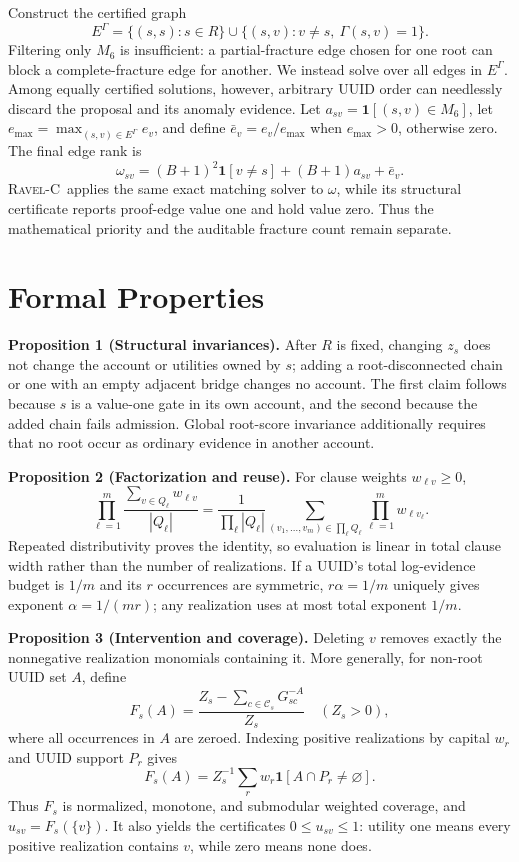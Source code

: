 \documentclass[runningheads]{llncs}
\newcommand{\ravelc}{\textsc{Ravel-C}}
\begin{document}
Construct the certified graph
\[
E^\Gamma=
\{(s,s):s\in R\}\cup
\{(s,v):v\ne s,\ \Gamma(s,v)=1\}.
\]
Filtering only \(M_6\) is insufficient: a partial-fracture edge chosen for one root can block a complete-fracture edge for another. We instead solve over all edges in \(E^\Gamma\). Among equally certified solutions, however, arbitrary UUID order can needlessly discard the proposal and its anomaly evidence. Let \(a_{sv}=\mathbf 1[(s,v)\in M_6]\), let \(e_{\max}=\max_{(s,v)\in E^\Gamma}e_v\), and define \(\bar e_v=e_v/e_{\max}\) when \(e_{\max}>0\), otherwise zero. The final edge rank is
\[
\omega_{sv}
=(B+1)^2\mathbf 1[v\ne s]
+(B+1)a_{sv}
+\bar e_v.
\]
\ravelc\ applies the same exact matching solver to \(\omega\), while its structural certificate reports proof-edge value one and hold value zero. Thus the mathematical priority and the auditable fracture count remain separate.

\section{Formal Properties}

\textbf{Proposition 1 (Structural invariances).}
After \(R\) is fixed, changing \(z_s\) does not change the account or utilities owned by \(s\); adding a root-disconnected chain or one with an empty adjacent bridge changes no account. The first claim follows because \(s\) is a value-one gate in its own account, and the second because the added chain fails admission. Global root-score invariance additionally requires that no root occur as ordinary evidence in another account.

\textbf{Proposition 2 (Factorization and reuse).}
For clause weights \(w_{\ell v}\ge0\),
\[
\prod_{\ell=1}^{m}\frac{\sum_{v\in Q_\ell}w_{\ell v}}{|Q_\ell|}
=\frac{1}{\prod_\ell|Q_\ell|}
\sum_{(v_1,\ldots,v_m)\in\prod_\ell Q_\ell}
\prod_{\ell=1}^{m}w_{\ell v_\ell}.
\]
Repeated distributivity proves the identity, so evaluation is linear in total clause width rather than the number of realizations. If a UUID's total log-evidence budget is \(1/m\) and its \(r\) occurrences are symmetric, \(r\alpha=1/m\) uniquely gives exponent \(\alpha=1/(mr)\); any realization uses at most total exponent \(1/m\).

\textbf{Proposition 3 (Intervention and coverage).}
Deleting \(v\) removes exactly the nonnegative realization monomials containing it. More generally, for non-root UUID set \(A\), define
\[
F_s(A)=
\frac{Z_s-\sum_{c\in\mathcal C_s}G_{sc}^{-A}}{Z_s}
\quad (Z_s>0),
\]
where all occurrences in \(A\) are zeroed. Indexing positive realizations by capital \(w_r\) and UUID support \(P_r\) gives
\[
F_s(A)=Z_s^{-1}\sum_r w_r
\mathbf 1[A\cap P_r\ne\varnothing].
\]
Thus \(F_s\) is normalized, monotone, and submodular weighted coverage, and \(u_{sv}=F_s(\{v\})\). It also yields the certificates \(0\le u_{sv}\le1\): utility one means every positive realization contains \(v\), while zero means none does.
\end{document}
